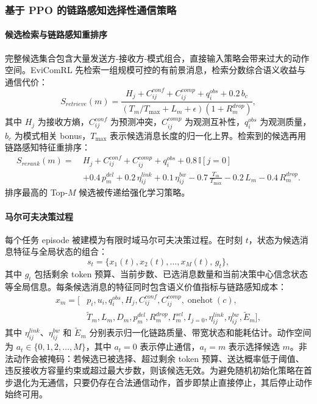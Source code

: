 \subsubsection{基于 PPO 的链路感知选择性通信策略}
\paragraph{候选检索与链路感知重排序}
完整候选集合包含大量发送方-接收方-模式组合，直接输入策略会带来过大的动作空间。EviComRL 先检索一组规模可控的有前景消息，检索分数综合语义收益与通信代价：
\begin{equation}
S_{retrieve}(m)=\frac{H_j+C_{ij}^{conf}+C_{ij}^{comp}+q_i^{obs}+0.2\,b_c}{\left(T_m/T_{\max}+L_m+\epsilon\right)\left(1+R_m^{drop}\right)},
\end{equation}
其中 $H_j$ 为接收方熵，$C_{ij}^{conf}$ 为预测冲突，$C_{ij}^{comp}$ 为观测互补性，$q_i^{obs}$ 为观测质量，$b_c$ 为模式相关 bonus，$T_{\max}$ 表示候选消息长度的归一化上界。检索到的候选再用链路感知特征重排序：
\begin{equation}
\begin{aligned}
S_{rerank}(m)=\ &H_j+C_{ij}^{conf}+C_{ij}^{comp}+q_i^{obs}+0.8\,\mathbb{I}[j=0]\\
&+0.4\,p_m^{del}+0.2\,\eta_{ij}^{link}+0.1\,\eta_{ij}^{bw}-0.7\,\frac{T_m}{T_{\max}}-0.2\,L_m-0.4\,R_m^{drop}.
\end{aligned}
\end{equation}
排序最高的 Top-$M$ 候选被传递给强化学习策略。
\paragraph{马尔可夫决策过程}
每个任务 episode 被建模为有限时域马尔可夫决策过程。在时刻 $t$，状态为候选消息特征与全局状态的组合：
\begin{equation}
s_t=\{x_1(t),x_2(t),\ldots,x_M(t),\,g_t\},
\end{equation}
其中 $g_t$ 包括剩余 token 预算、当前步数、已选消息数量和当前决策中心信念状态等全局信息。每条候选消息的特征同时包含语义价值指标与链路感知成本：
\begin{equation}
\begin{aligned}
x_m=\bigl[&
p_i,u_i,q_i^{obs},H_j,C_{ij}^{conf},C_{ij}^{comp},
\operatorname{onehot}(c),\\
&\tilde{T}_m,L_m,D_m,p_m^{del},R_m^{drop},
I_m^{sel},I_{j=0},\eta_{ij}^{link},\eta_{ij}^{bw},\tilde{E}_m
\bigr],
\end{aligned}
\end{equation}
其中 $\eta_{ij}^{link}$、$\eta_{ij}^{bw}$ 和 $\tilde{E}_m$ 分别表示归一化链路质量、带宽状态和能耗估计。动作空间为 $a_t\in\{0,1,2,\ldots,M\}$，其中 $a_t=0$ 表示停止通信，$a_t=m$ 表示选择候选 $m$。非法动作会被掩码：若候选已被选择、超过剩余 token 预算、送达概率低于阈值、违反接收方容量约束或超过最大步数，则该候选无效。为避免随机初始化策略在首步退化为无通信，只要仍存在合法通信动作，首步即禁止直接停止，其后停止动作始终可用。
